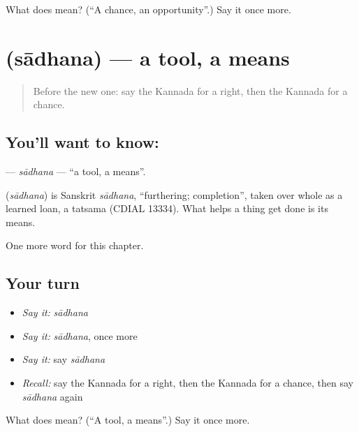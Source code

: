 \begin{tcolorbox}[breakable,colback=teal!4,colframe=teal!35!black,title={Before you move on}]
What does  mean? (\textquotedblleft{}A chance, an opportunity\textquotedblright{}.) Say it once more.
\end{tcolorbox}
\section[\texorpdfstring{\kn{ಸಾಧನ} (sādhana)}{ಸಾಧನ (sādhana)}]{ (sādhana) — a tool, a means}

\label{lesson:KA-C112-sadhana}



\begin{quote}
Before the new one: say the Kannada for a right, then the Kannada for a chance.
\end{quote}

\subsection*{You'll want to know: }
\textbf{} — \emph{sādhana} — \textquotedblleft{}a tool, a means\textquotedblright{}.

\begin{cousinweb}
\textbf{} (\emph{sādhana}) is Sanskrit \emph{sādhana}, \textquotedblleft{}furthering; completion\textquotedblright{}, taken over whole as a learned loan, a tatsama (CDIAL 13334). What helps a thing get done is its means.
\end{cousinweb}

\begin{grammarlens}[title={What you've built}]
One more word for this chapter.
\end{grammarlens}

\subsection*{Your turn}
\begin{itemize}
\raggedright
  \item \emph{Say it:} \emph{sādhana}
  \item \emph{Say it:} \emph{sādhana}, once more
  \item \emph{Say it:} say \emph{sādhana}
  \item \emph{Recall:} say the Kannada for a right, then the Kannada for a chance, then say \emph{sādhana} again
\end{itemize}

\begin{tcolorbox}[breakable,colback=teal!4,colframe=teal!35!black,title={Before you move on}]
What does  mean? (\textquotedblleft{}A tool, a means\textquotedblright{}.) Say it once more.
\end{tcolorbox}
